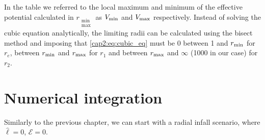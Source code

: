In the table we referred to the local maximum and minimum of the effective
potential calculated in $r_{\substack{\text{min} \\ \text{max}}}$ as
$V_{\rm min}$ and $V_{\rm max}$ respectively.
Instead of solving the cubic equation analytically, the limiting radii can be
calculated using the bisect method and imposing that \ref{cap2:eq:cubic_eq}
must be 0 between 1 and $r_{\rm min}$ for $r_e$, between $r_{\rm min}$ and
$r_{\rm max}$ for $r_1$ and between $r_{\rm max}$ and $\infty$ (1000 in our
case) for $r_2$.







\section{Numerical integration}

Similarly to the previous chapter, we can start with a radial infall scenario,
where $\hat \ell = 0$, $\mathcal E = 0$.

